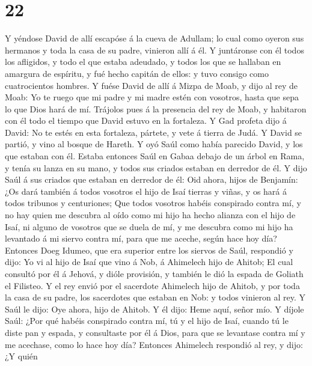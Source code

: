 \hypertarget{section-21}{%
\section{22}\label{section-21}}

 Y yéndose David de allí escapóse á la cueva de Adullam;
lo cual como oyeron sus hermanos y toda la casa de su padre, vinieron
allí á él.  Y juntáronse con él todos los afligidos, y
todo el que estaba adeudado, y todos los que se hallaban en amargura de
espíritu, y fué hecho capitán de ellos: y tuvo consigo como
cuatrocientos hombres.  Y fuése David de allí á Mizpa de
Moab, y dijo al rey de Moab: Yo te ruego que mi padre y mi madre estén
con vosotros, hasta que sepa lo que Dios hará de mí. 
Trájolos pues á la presencia del rey de Moab, y habitaron con él todo el
tiempo que David estuvo en la fortaleza.  Y Gad profeta
dijo á David: No te estés en esta fortaleza, pártete, y vete á tierra de
Judá. Y David se partió, y vino al bosque de Hareth.  Y
oyó Saúl como había parecido David, y los que estaban con él. Estaba
entonces Saúl en Gabaa debajo de un árbol en Rama, y tenía su lanza en
su mano, y todos sus criados estaban en derredor de él.  Y
dijo Saúl á sus criados que estaban en derredor de él: Oid ahora, hijos
de Benjamín: ¿Os dará también á todos vosotros el hijo de Isaí tierras y
viñas, y os hará á todos tribunos y centuriones;  Que
todos vosotros habéis conspirado contra mí, y no hay quien me descubra
al oído como mi hijo ha hecho alianza con el hijo de Isaí, ni alguno de
vosotros que se duela de mí, y me descubra como mi hijo ha levantado á
mi siervo contra mí, para que me aceche, según hace hoy día?
 Entonces Doeg Idumeo, que era superior entre los siervos
de Saúl, respondió y dijo: Yo vi al hijo de Isaí que vino á Nob, á
Ahimelech hijo de Ahitob;  El cual consultó por él á
Jehová, y dióle provisión, y también le dió la espada de Goliath el
Filisteo.  Y el rey envió por el sacerdote Ahimelech hijo
de Ahitob, y por toda la casa de su padre, los sacerdotes que estaban en
Nob: y todos vinieron al rey.  Y Saúl le dijo: Oye ahora,
hijo de Ahitob. Y él dijo: Heme aquí, señor mío.  Y
díjole Saúl: ¿Por qué habéis conspirado contra mí, tú y el hijo de Isaí,
cuando tú le diste pan y espada, y consultaste por él á Dios, para que
se levantase contra mí y me acechase, como lo hace hoy día?
 Entonces Ahimelech respondió al rey, y dijo: ¿Y quién

